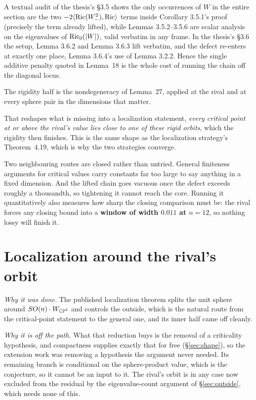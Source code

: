 A textual audit of the thesis's \S3.5 shows the only occurrences of $W$ in the entire section are the two $-2\langle\mathrm{Ric}(W_-^2),\mathrm{Ric}\rangle$ terms inside Corollary 3.5.1's proof (precisely the term already lifted), while Lemmas 3.5.2--3.5.6 are scalar analysis on the eigenvalues of $\mathrm{Ric}_0(|W|)$, valid verbatim in any frame. In the thesis's \S3.6 the setup, Lemma 3.6.2 and Lemma 3.6.3 lift verbatim, and the defect re-enters at exactly one place, Lemma 3.6.4's use of Lemma 3.2.2. Hence the single additive penalty quoted in Lemma~18 is the whole cost of running the chain off the diagonal locus.

The rigidity half is the nondegeneracy of Lemma~27, applied at the rival and at every sphere pair in the dimensions that matter.

That reshapes what is missing into a localization statement, \emph{every critical point at or above the rival's value lies close to one of these rigid orbits}, which the rigidity then finishes. This is the same shape as the localization strategy's Theorem~4.19, which is why the two strategies converge.

Two neighbouring routes are closed rather than untried. General finiteness arguments for critical values carry constants far too large to say anything in a fixed dimension. And the lifted chain goes vacuous once the defect exceeds roughly a thousandth, so tightening it cannot reach the core. Running it quantitatively also measures how sharp the closing comparison must be: the rival forces any closing bound into a \textbf{window of width $0.011$ at $n=12$}, so nothing lossy will finish it.


\section{Localization around the rival's orbit}\label{app:D}

\emph{Why it was done.} The published localization theorem splits the unit sphere around $SO(n)\cdot W_{\mathbb{CP}^2}$ and controls the outside, which is the natural route from the critical-point statement to the general one, and its inner half came off cleanly.

\emph{Why it is off the path.} What that reduction buys is the removal of a criticality hypothesis, and compactness supplies exactly that for free (\S\ref{sec:shape}), so the extension work was removing a hypothesis the argument never needed. Its remaining branch is conditional on the sphere-product value, which is the conjecture, so it cannot be an input to it. The rival's orbit is in any case now excluded from the residual by the eigenvalue-count argument of \S\ref{sec:outside}, which needs none of this.

